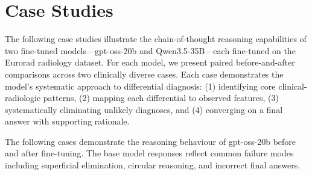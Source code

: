 \documentclass[10pt,journal,compsoc, onecolumn]{IEEEtran}
\begin{document}
\section*{Case Studies}
The following case studies illustrate the chain-of-thought reasoning capabilities of two fine-tuned models---gpt-oss-20b and Qwen3.5-35B---each fine-tuned on the Eurorad radiology dataset. For each model, we present paired before-and-after comparisons across two clinically diverse cases. Each case demonstrates the model's systematic approach to differential diagnosis: (1) identifying core clinical-radiologic patterns, (2) mapping each differential to observed features, (3) systematically eliminating unlikely diagnoses, and (4) converging on a final answer with supporting rationale.

\vspace{1em}

The following cases demonstrate the reasoning behaviour of gpt-oss-20b before and after fine-tuning. The base model responses reflect common failure modes including superficial elimination, circular reasoning, and incorrect final answers.

\vspace{1em}
\end{document}
